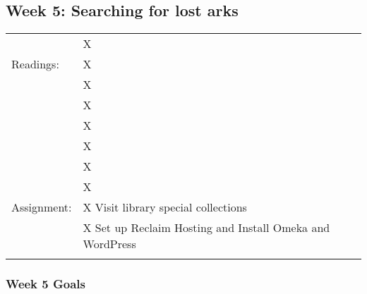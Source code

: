 \documentclass[]{article}
\begin{document}
\subsection{Week 5: Searching for lost
arks}\label{week-5-searching-for-lost-arks}

\begin{longtable}[c]{@{}ll@{}}
\toprule\addlinespace
& X
\\\addlinespace
Readings: & X
\\\addlinespace
& X
\\\addlinespace
& X
\\\addlinespace
& X
\\\addlinespace
& X
\\\addlinespace
& X
\\\addlinespace
& X
\\\addlinespace
Assignment: & X Visit library special collections
\\\addlinespace
& X Set up Reclaim Hosting and Install Omeka and WordPress
\\\addlinespace
\bottomrule
\end{longtable}

\subsubsection{Week 5 Goals}\label{week-5-goals}
\end{document}
